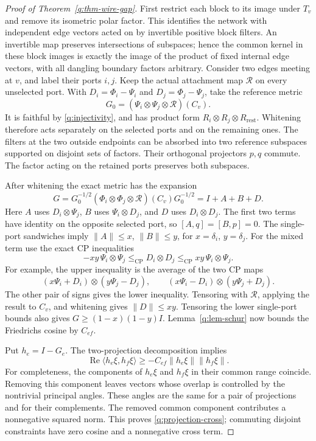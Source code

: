 \begin{proof}[Proof of Theorem~\ref{q:thm-wire-gap}]
First restrict each block to its image under $T_v$ and remove its
isometric polar factor.  This identifies the network with independent
edge vectors acted on by invertible positive block filters.  An invertible
map preserves intersections of subspaces; hence the common kernel in
these block images is exactly the image of the product of fixed internal
edge vectors, with all dangling boundary factors arbitrary.  Consider
two edges meeting at $v$, and label their ports $i,j$.  Keep the actual
attachment map $\mathcal R$ on every unselected port.  With
$D_i=\Phi_i-\Psi_i$ and $D_j=\Phi_j-\Psi_j$, take the reference metric
\[
 G_0=(\Psi_i\otimes\Psi_j\otimes\mathcal R)(C_v).
\]
It is faithful by \eqref{q:injectivity}, and has product form
$R_i\otimes R_j\otimes R_{\mathrm{rest}}$.  Whitening therefore
acts separately on the selected ports and on the remaining ones.
The filters at the two outside endpoints can be absorbed into two
reference subspaces supported on disjoint sets of factors.  Their
orthogonal projectors $p,q$ commute.  The factor acting on the retained
ports preserves both subspaces.

After whitening the exact metric has the expansion
\[
 G=G_0^{-1/2}(\Phi_i\otimes\Phi_j\otimes\mathcal R)(C_v)G_0^{-1/2}
   =I+A+B+D.
\]
Here $A$ uses $D_i\otimes\Psi_j$, $B$ uses
$\Psi_i\otimes D_j$, and $D$ uses $D_i\otimes D_j$.
The first two terms have identity on the opposite selected port, so
$[A,q]=[B,p]=0$.  The single-port sandwiches imply
$\|A\|\leq x$, $\|B\|\leq y$, for $x=\delta_i$, $y=\delta_j$.
For the mixed term use the exact CP inequalities
\[
 -xy\,\Psi_i\otimes\Psi_j
 \leq_{\mathrm{CP}}D_i\otimes D_j
 \leq_{\mathrm{CP}}xy\,\Psi_i\otimes\Psi_j.
\]
For example, the upper inequality is the average of the two CP maps
\[
 (x\Psi_i+D_i)\otimes(y\Psi_j-D_j),\qquad
 (x\Psi_i-D_i)\otimes(y\Psi_j+D_j).
\]
The other pair of signs gives the lower inequality.  Tensoring with
$\mathcal R$, applying the result to $C_v$, and whitening gives
$\|D\|\leq xy$.  Tensoring the lower single-port bounds also gives
$G\geq(1-x)(1-y)I$.  Lemma~\ref{q:lem-schur} now bounds the
Friedrichs cosine by $C_{ef}$.

Put $h_e=I-G_e$.  The two-projection decomposition implies
\begin{equation}
 \operatorname{Re}\langle h_e\xi,h_f\xi\rangle
 \geq-C_{ef}\|h_e\xi\|\|h_f\xi\|.
 \label{q:projection-cross}
\end{equation}
For completeness, the components of $h_e\xi$ and $h_f\xi$ in their
common range coincide.  Removing this component leaves vectors whose
overlap is controlled by the nontrivial principal angles.  These angles
are the same for a pair of projections and for their complements.
The removed common component contributes a nonnegative squared norm.
This proves \eqref{q:projection-cross}; commuting disjoint constraints
have zero cosine and a nonnegative cross term.


\end{proof}
